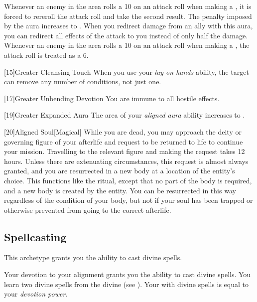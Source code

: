          Whenever an enemy in the area rolls a 10 on an attack roll when making a , it is forced to rereroll the attack roll and take the second result.
         The penalty imposed by the aura increases to .
         When you redirect damage from an ally with this aura, you can redirect all effects of the attack to you instead of only half the damage.
         Whenever an enemy in the area rolls a 10 on an attack roll when making a , the attack roll is treated as a 6.

        [15]{Greater Cleansing Touch} When you use your \textit{lay on hands} ability, the target can remove any number of conditions, not just one.

        [17]{Greater Unbending Devotion}
        You are immune to all hostile  effects.

        [19]{Greater Expanded Aura} The area of your \textit{aligned aura} ability increases to \areahuge.

        [20]{Aligned Soul}[Magical]
        While you are dead, you may approach the deity or governing figure of your afterlife and request to be returned to life to continue your mission.
        Travelling to the relevant figure and making the request takes 12 hours.
        Unless there are extenuating circumstances, this request is almost always granted, and you are resurrected in a new body at a location of the entity's choice.
        This functions like the  ritual, except that no part of the body is required, and a new body is created by the entity.
        You can be resurrected in this way regardless of the condition of your body, but not if your soul has been trapped or otherwise prevented from going to the correct afterlife.

    \subsection{Spellcasting}
        This archetype grants you the ability to cast divine spells.

        Your devotion to your alignment grants you the ability to cast divine spells.
        You learn two divine spells from the divine  (see ).
        Your  with divine spells is equal to your \textit{devotion power}.

